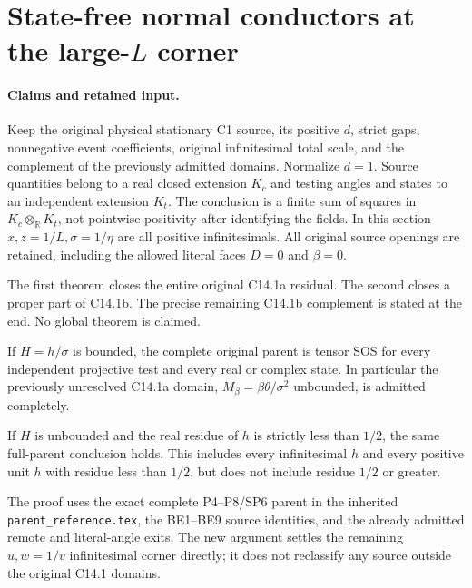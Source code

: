\section{State-free normal conductors at the large-$L$ corner}
\label{sec:c141-state-free}

\paragraph{Claims and retained input.}
Keep the original physical stationary C1 source, its positive $d$,
strict gaps, nonnegative event coefficients, original infinitesimal
total scale, and the complement of the previously admitted domains.
Normalize $d=1$. Source quantities belong to a real closed extension
$K_c$ and testing angles and states to an independent extension $K_t$.
The conclusion is a finite sum of squares in
$K_c\otimes_{\mathbb R}K_t$, not pointwise positivity after identifying
the fields. In this section $x,z=1/L,\sigma=1/\eta$ are all positive
infinitesimals. All original source openings are retained, including
the allowed literal faces $D=0$ and $\beta=0$.

The first theorem closes the entire original C14.1a residual. The
second closes a proper part of C14.1b. The precise remaining C14.1b
complement is stated at the end. No global theorem is claimed.

\begin{theorem}[C14.1a]
If $H=h/\sigma$ is bounded, the complete original parent is tensor
SOS for every independent projective test and every real or complex
state. In particular the previously unresolved C14.1a domain,
$M_\beta=\beta\theta/\sigma^2$ unbounded, is admitted completely.
\end{theorem}

\begin{theorem}
If $H$ is unbounded and the real residue of $h$ is strictly less
than $1/2$, the same full-parent conclusion holds. This includes
every infinitesimal $h$ and every positive unit $h$ with residue
less than $1/2$, but does not include residue $1/2$ or greater.
\end{theorem}

The proof uses the exact complete P4--P8/SP6 parent in the inherited
\texttt{parent\_reference.tex}, the BE1--BE9 source identities, and the
already admitted remote and literal-angle exits. The new argument
settles the remaining $u,w=1/v$ infinitesimal corner directly; it does
not reclassify any source outside the original C14.1 domains.

